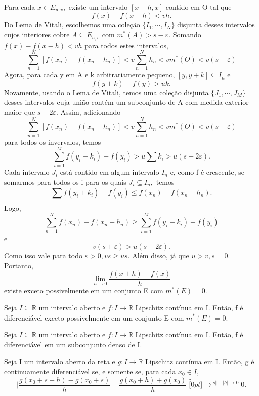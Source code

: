 \documentclass[analysis_notes.tex]{subfiles}
\begin{document}
\begin{proof*}
	Para cada \(x\in E_{u, v},\) existe um intervalo \([x-h, x]\) contido em O tal que
	\[
		f(x) - f(x-h) < vh.
	\]
	Do \hyperlink{vitali_covering}{Lema de Vitali,} escolhemos uma cole\c cão \(\{I_{1}, \cdots, I_{N}\} \)
	disjunta desses intervalos cujos interiores cobre \(A\subseteq{E_{u, v}}\) com
	\(m^{*}(A) > s-\varepsilon .\) Somando \(f(x) - f(x-h) < vh\) para todos estes intervalos,
	\[
		\sum\limits_{n=1}^{N}[f(x_{n}) - f(x_{n}-h_{n})] < v \sum\limits_{n=1}^{N}h_{n} < vm^{*}(O) < v(s+\varepsilon )
	\]
	Agora, para cada y em A e k arbitrariamente pequeno, \([y, y+k]\subseteq{I_{n}}\) e
	\[
		f(y+k)-f(y) > uk.
	\]
	Novamente, usando o \hyperlink{vitali_covering}{Lema de Vitali,} temos uma cole\c cão
	disjunta \(\{J_{1}, \cdots, J_{M}\}\) desses intervalos cuja união contém um
	subconjunto de A com medida exterior maior que \(s-2\varepsilon .\) Assim,
	adicionando
	\[
		\sum\limits_{n=1}^{N}[f(x_{n}) - f(x_{n}-h_{n})] < v \sum\limits_{n=1}^{N}h_{n} < vm^{*}(O) < v(s+\varepsilon )
	\]
	para todos os invervalos, temos
	\[
		\sum\limits_{i=1}^{M}f(y_{i}-k_{i})-f(y_{i}) > u\sum k_{i} > u (s-2\varepsilon ).
	\]
	Cada intervalo \(J_{i}\) está contido em algum intervalo \(I_{n}\) e, como f é
	crescente, se somarmos para todos os i para os quais \(J_{i}\subseteq{I_{n}},\) temos
	\[
		\sum\limits_{}^{}f(y_{i}+k_{i}) - f(y_{i})\leq f(x_{n}) - f(x_{n}-h_{n}).
	\]
	Logo,
	\[
		\sum\limits_{n=1}^{N}f(x_{n})-f(x_{n}-h_{n})\geq \sum\limits_{i=1}^{M}f(y_{i}+k_{i}) - f(y_{i})
	\]
	e
	\[
		v(s+\varepsilon ) > u(s-2\varepsilon ).
	\]
	Como isso vale para todo \(\varepsilon >0, vs\geq us.\) Além disso, já que
	\(u > v, s=0.\) Portanto,
	\[
		\lim_{h\to 0}\frac{f(x+h)-f(x)}{h}
	\]
	existe exceto possivelmente em um conjunto E com \(m^{*}(E) = 0.\) \qedsymbol
\end{proof*}
\begin{crl*}
	Seja \(I\subseteq{\mathbb{R}}\) um intervalo aberto e \(f:I\rightarrow \mathbb{R}\) Lipschitz contínua em I.
	Então, f é diferenciável exceto possivelmente em um conjunto E com \(m^{*}(E) = 0.\)
\end{crl*}
\begin{crl*}
	Seja \(I\subseteq{\mathbb{R}}\) um intervalo aberto e \(f:I\rightarrow \mathbb{R}\) Lipschitz contínua em I. Então, f é diferenciável em um
	subconjunto denso de I.
\end{crl*}
\begin{theorem*}
	Seja I um intervalo aberto da reta e \(g:I\rightarrow \mathbb{R}\) Lipschitz contínua
	em I. Então, g é continuamente diferenciável se, e somente se, para cada \(x_{0}\in I,\)
	\[
		\biggl|\frac{g(x_{0}+s+h)-g(x_{0}+s)}{h}-\frac{g(x_{0}+h)+g(x_{0})}{h}\biggr|\overbracket[0pt]{\longrightarrow}^{|s|+|h|\to 0}0.
	\]
\end{theorem*}
\end{document}
